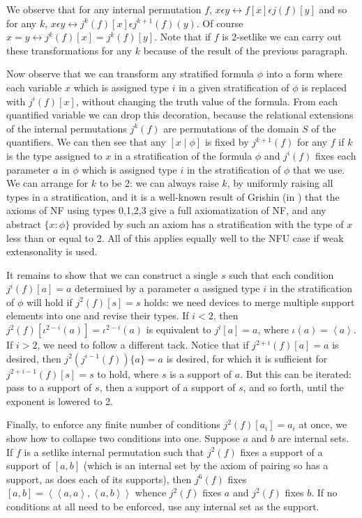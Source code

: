 \documentclass[12pt]{article}
\begin{document}
\begin{description}
We observe that for any internal permutation $f$, $x \epsilon y \leftrightarrow f[x] \epsilon j(f)[y]$ and so for any $k$, $x \epsilon y \leftrightarrow j^k(f)[x] \epsilon j^{k+1}(f)(y)$.  Of course
$x=y \leftrightarrow j^k(f)[x] = j^k(f)[y]$.  Note that if $f$ is 2-setlike we can carry out these transformations for any $k$ because of the result of the previous paragraph.

Now observe that we can transform any stratified formula $\phi$ into a form where each variable $x$ which is assigned type $i$ in a given stratification of $\phi$ is replaced with $j^i(f)[x]$, without changing the truth value of the formula.
From each quantified variable we can drop this decoration, because the relational extensions of the internal permutations $j^k(f)$ are permutations of the domain $S$ of the quantifiers.    We can then see that any $[x \mid \phi]$ is fixed by 
$j^{k+1}(f)$ for any $f$ if $k$ is the type assigned to $x$ in a stratification of the formula $\phi$ and $j^i(f)$ fixes each parameter $a$ in $\phi$ which is assigned
type $i$ in the stratification of $\phi$ that we use.  We can arrange for $k$ to be 2:  we can always raise $k$, by uniformly raising all types in a stratification, and it is a well-known result of Grishin (in \cite{grishin})  that the axioms of NF using types 0,1,2,3 give a full axiomatization of NF, and any abstract $\{x:\phi\}$ provided by such an axiom has a stratification with the type of $x$ less than or equal to 2.  All of this applies equally well to the NFU case if weak extensonality is used.

It remains to show that we can construct a single $s$ such that each condition $j^i(f)[a]=a$ determined by a parameter $a$ assigned type $i$ in the stratification of $\phi$ will hold if $j^2(f)[s]=s$ holds:  we need devices to merge multiple support elements into
one and revise their types.  If $i<2$, then $j^2(f)[\iota^{2-i}(a)]=\iota^{2-i}(a)$ is equivalent to $j^i[a]=a$, where $\iota(a)=\left<a\right>$.  If $i>2$, we need to follow a different tack.
Notice that if $j^{2+i}(f)[a]=a$ is desired, then $j^2(j^{i-1}(f))\{a\}=a$ is desired, for which it is sufficient for $j^{2+i-1}(f)[s]=s$ to hold, where $s$ is a support of $a$.  But this can be iterated:
pass to a support of $s$, then a support of a support of $s$, and so forth, until the exponent is lowered to 2.

Finally, to enforce any finite number of conditions $j^2(f)[a_i]=a_i$ at once, we show how to collapse two conditions into one.  Suppose $a$ and $b$ are internal sets.  If $f$ is a setlike internal permutation such that
$j^2(f)$ fixes a support of a support of $[a,b]$ (which is an internal set by the axiom of pairing so has a support, as does each of its supports), then $j^6(f)$ fixes $[a,b]=\left<\left<a,a\right>,\left<a,b\right>\right>$ whence $j^2(f)$ fixes $a$ and $j^2(f)$ fixes $b$.  If no conditions at all need to be enforced, use any internal set as the support.


\end{description}
\end{document}
